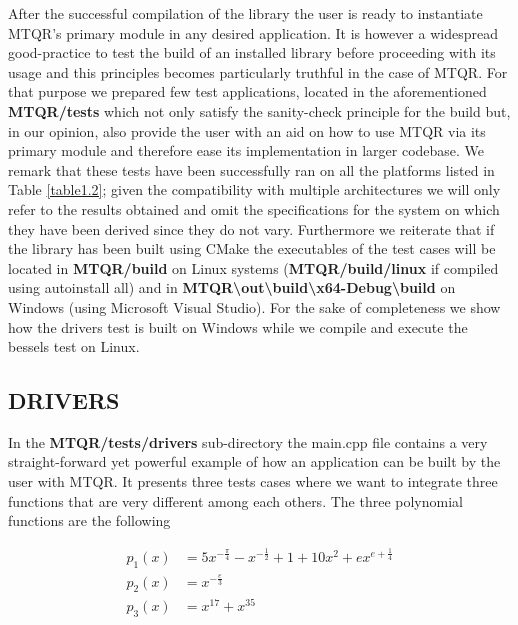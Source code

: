 \documentclass[a4paper, twosided]{book}
\begin{document}
\noindent
After the successful compilation of the library the user is ready to instantiate MTQR's primary module in any desired application. It is however a widespread good-practice to test the build of an installed library before proceeding with its usage and this principles becomes particularly truthful in the case of MTQR. For that purpose we prepared few test applications, located in the aforementioned \colorbox{poliGrayBlue}{\textbf{MTQR/tests}} which not only satisfy the sanity-check principle for the build but, in our opinion, also provide the user with an aid on how to use MTQR via its primary module and therefore ease its implementation in larger codebase. We remark that these tests have been successfully ran on all the platforms listed in Table \ref{table1.2}; given the compatibility with multiple architectures we will only refer to the results obtained and omit the specifications for the system on which they have been derived since they do not vary. Furthermore we reiterate that if the library has been built using CMake the executables of the test cases will be located in \colorbox{poliGrayBlue}{\textbf{MTQR/build}} on Linux systems (\colorbox{poliGrayBlue}{\textbf{MTQR/build/linux}} if compiled using \colorbox{poliGrayBlue}{autoinstall all}) and in \colorbox{poliGrayBlue}{\textbf{MTQR\textbackslash out\textbackslash build\textbackslash x64-Debug\textbackslash build}} on Windows (using Microsoft Visual Studio). For the sake of completeness we show how the \colorbox{poliGrayBlue}{drivers} test is built on Windows while we compile and execute the \colorbox{poliGrayBlue}{bessels} test on Linux.

\subsection[Drivers]{\changefont DRIVERS}\label{SubSec2.4.1}

In the \colorbox{poliGrayBlue}{\textbf{MTQR/tests/drivers}} sub-directory the \colorbox{poliGrayBlue}{main.cpp} file contains a very straight-forward yet powerful example of how an application can be built by the user with MTQR. It presents three tests cases where we want to integrate three functions that are very different among each others. The three polynomial functions are the following

\begin{equation*}
    \begin{split}
        p_1(x) & = 5x^{-\frac{\pi}{4}}-x^{-\frac{1}{2}}+1+10x^{2}+ex^{e+\frac{1}{4}} \\
        p_2(x) & = x^{-\frac{e}{3}} \\
        p_3(x) & = x^{17} + x^{35}
    \end{split}
\end{equation*}
\end{document}
